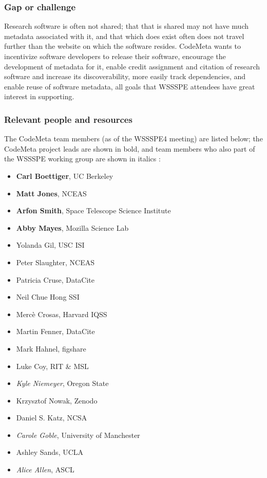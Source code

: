 \subsubsection{Gap or challenge}

Research software is often not shared; that that is shared may not have much metadata associated with it, and that which does exist often does not travel further than the website on which the software resides. CodeMeta wants to incentivize software developers to release their software, encourage the development of metadata for it, enable credit assignment and citation of research software and increase its discoverability, more easily track dependencies, and enable reuse of software metadata, all goals that WSSSPE attendees have great interest in supporting. 

\subsubsection{Relevant people and resources}

The CodeMeta team members (as of the WSSSPE4 meeting) are listed below; the CodeMeta project leads are shown in bold, and team members who also part of the WSSSPE working group are shown in italics :

\begin{itemize}
\item {\bf Carl Boettiger}, UC Berkeley
\item {\bf Matt Jones}, NCEAS
\item {\bf Arfon Smith}, Space Telescope Science Institute
\item {\bf Abby Mayes}, Mozilla Science Lab
\item Yolanda Gil, USC ISI
\item Peter Slaughter, NCEAS
\item Patricia Cruse, DataCite
\item Neil Chue Hong SSI
\item Merc\`{e} Crosas, Harvard IQSS
\item Martin Fenner, DataCite
\item Mark Hahnel, figshare
\item Luke Coy, RIT \& MSL
\item {\em Kyle Niemeyer}, Oregon State
\item Krzysztof Nowak, Zenodo
\item Daniel S. Katz, NCSA
\item {\em Carole Goble}, University of Manchester
\item Ashley Sands, UCLA
\item {\em Alice Allen}, ASCL

\end {itemize}

